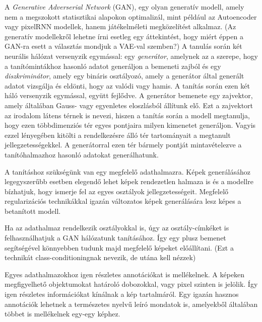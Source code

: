 
A \textit{Generative Adverserial Network} (GAN), egy olyan generatív modell, amely nem a megszokott statisztikai alapokon optimalizál, mint például az Autoencoder vagy pixelRNN modellek, hanem játékelméleti megközelítést alkalmaz. (Az generatív modellekről lehetne írni esetleg egy áttekintést, hogy miért éppen a GAN-ra esett a választás mondjuk a VAE-val szemben?)
A tanulás során két neurális hálózat versenyzik egymással: egy \textit{generátor}, amelynek az a szerepe, hogy a tanítómintákhoz hasonló adatot generáljon a bemeneti zajból és egy \textit{diszkriminátor}, amely egy bináris osztályozó, amely a generátor által generált adatot vizsgálja és eldönti, hogy az valódi vagy hamis.
A tanítás során ezen két háló versenyzik egymással, együtt fejlődve.
A generátor bemenete egy zajvektor, amely általában Gauss- vagy egyenletes eloszlásból állítunk elő. Ezt a zajvektort az irodalom látens térnek is nevezi, hiszen a tanítás során a modell megtanulja, hogy ezen többdimenziós tér egyes pontjaira milyen kimenetet generáljon. Vagyis ezzel lényegében kitölti a rendelkezésre álló tér tartományait a megtanult jellegzetességekkel. A generátorral ezen tér bármely pontját mintavételezve a tanítóhalmazhoz hasonló adatokat generálhatunk.

A tanításhoz szükségünk van egy megfelelő adathalmazra. Képek generálásához legegyszerűbb esetben elegendő lehet képek rendezetlen halmaza is és a modellre bízhatjuk, hogy ismerje fel az egyes osztályok jellegzetességeit. Megfelelő regularizációs technikákkal igazán változatos képek generálására lesz képes a betanított modell.

Ha az adathalmaz rendelkezik osztályokkal is, úgy az osztály-címkéket is felhasználhatjuk a GAN hálózatunk tanításához. Így egy plusz bemenet segítségével könnyebben tudunk majd megfelelő képeket előállítani. (Ezt a technikát class-conditioningnak nevezik, de utána kell nézzek)

Egyes adathalmazokhoz igen részletes annotációkat is mellékelnek. A képeken megfigyelhető objektumokat határoló dobozokkal, vagy pixel szinten is jelölik. Így igen részletes információkat kínálnak a kép tartalmáról. Egy igazán hasznos annotációk lehetnek a természetes nyelvű leíró mondatok is, amelyekből általában többet is mellékelnek egy-egy képhez.

